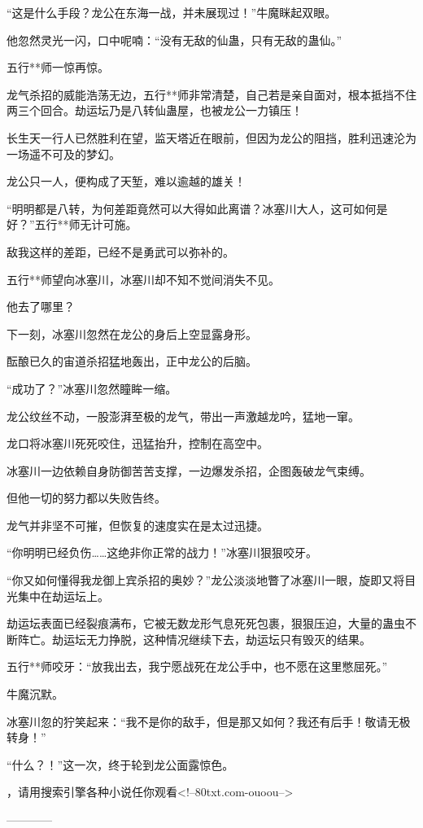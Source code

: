 \begin{this_body}
“这是什么手段？龙公在东海一战，并未展现过！”牛魔眯起双眼。

他忽然灵光一闪，口中呢喃：“没有无敌的仙蛊，只有无敌的蛊仙。”

五行**师一惊再惊。

龙气杀招的威能浩荡无边，五行**师非常清楚，自己若是亲自面对，根本抵挡不住两三个回合。劫运坛乃是八转仙蛊屋，也被龙公一力镇压！

长生天一行人已然胜利在望，监天塔近在眼前，但因为龙公的阻挡，胜利迅速沦为一场遥不可及的梦幻。

龙公只一人，便构成了天堑，难以逾越的雄关！

“明明都是八转，为何差距竟然可以大得如此离谱？冰塞川大人，这可如何是好？”五行**师无计可施。

敌我这样的差距，已经不是勇武可以弥补的。

五行**师望向冰塞川，冰塞川却不知不觉间消失不见。

他去了哪里？

下一刻，冰塞川忽然在龙公的身后上空显露身形。

酝酿已久的宙道杀招猛地轰出，正中龙公的后脑。

“成功了？”冰塞川忽然瞳眸一缩。

龙公纹丝不动，一股澎湃至极的龙气，带出一声激越龙吟，猛地一窜。

龙口将冰塞川死死咬住，迅猛抬升，控制在高空中。

冰塞川一边依赖自身防御苦苦支撑，一边爆发杀招，企图轰破龙气束缚。

但他一切的努力都以失败告终。

龙气并非坚不可摧，但恢复的速度实在是太过迅捷。

“你明明已经负伤……这绝非你正常的战力！”冰塞川狠狠咬牙。

“你又如何懂得我龙御上宾杀招的奥妙？”龙公淡淡地瞥了冰塞川一眼，旋即又将目光集中在劫运坛上。

劫运坛表面已经裂痕满布，它被无数龙形气息死死包裹，狠狠压迫，大量的蛊虫不断阵亡。劫运坛无力挣脱，这种情况继续下去，劫运坛只有毁灭的结果。

五行**师咬牙：“放我出去，我宁愿战死在龙公手中，也不愿在这里憋屈死。”

牛魔沉默。

冰塞川忽的狞笑起来：“我不是你的敌手，但是那又如何？我还有后手！敬请无极转身！”

“什么？！”这一次，终于轮到龙公面露惊色。

，请用搜索引擎各种小说任你观看<!--80txt.com-ouoou-->

------------

\end{this_body}

